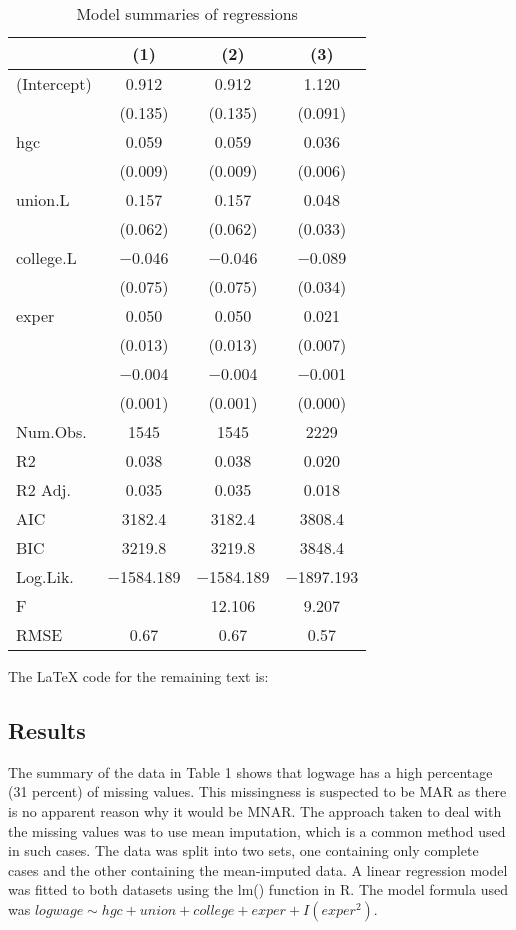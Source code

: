 \documentclass{article}
\begin{document}
\begin{table}
\begin{tabular}[t]{lccc}
\toprule
  & (1) & (2) & (3)\\
\midrule
(Intercept) & \num{0.912} & \num{0.912} & \num{1.120}\\
 & (\num{0.135}) & (\num{0.135}) & (\num{0.091})\\
hgc & \num{0.059} & \num{0.059} & \num{0.036}\\
 & (\num{0.009}) & (\num{0.009}) & (\num{0.006})\\
union.L & \num{0.157} & \num{0.157} & \num{0.048}\\
 & (\num{0.062}) & (\num{0.062}) & (\num{0.033})\\
college.L & \num{-0.046} & \num{-0.046} & \num{-0.089}\\
 & (\num{0.075}) & (\num{0.075}) & (\num{0.034})\\
exper & \num{0.050} & \num{0.050} & \num{0.021}\\
 & (\num{0.013}) & (\num{0.013}) & (\num{0.007})\\
 & \num{-0.004} & \num{-0.004} & \num{-0.001}\\
 & (\num{0.001}) & (\num{0.001}) & (\num{0.000})\\
\midrule
Num.Obs. & \num{1545} & \num{1545} & \num{2229}\\
R2 & \num{0.038} & \num{0.038} & \num{0.020}\\
R2 Adj. & \num{0.035} & \num{0.035} & \num{0.018}\\
AIC & \num{3182.4} & \num{3182.4} & \num{3808.4}\\
BIC & \num{3219.8} & \num{3219.8} & \num{3848.4}\\
Log.Lik. & \num{-1584.189} & \num{-1584.189} & \num{-1897.193}\\
F &  & \num{12.106} & \num{9.207}\\
RMSE & \num{0.67} & \num{0.67} & \num{0.57}\\
\bottomrule
\end{tabular}
\caption{Model summaries of regressions}
The LaTeX code for the remaining text is:

\subsection*{Results}

The summary of the data in Table 1 shows that logwage has a high percentage (31 percent) of missing values. This missingness is suspected to be MAR as there is no apparent reason why it would be MNAR. The approach taken to deal with the missing values was to use mean imputation, which is a common method used in such cases. The data was split into two sets, one containing only complete cases and the other containing the mean-imputed data. A linear regression model was fitted to both datasets using the lm() function in R. The model formula used was $logwage \sim hgc + union + college + exper + I(exper^2)$.


\end{table}
\end{document}
